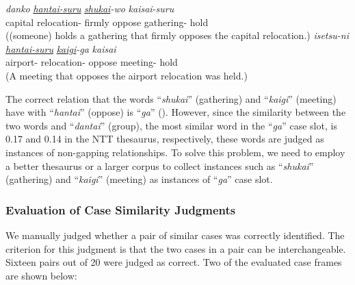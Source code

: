 \documentclass[english]{jnlp_1.4_rep}
\newcommand{\nom}{}
\newcommand{\acc}{}
\newcommand{\dat}{}
\newcommand{\gen}{}
\begin{document}
\begin{exe}
\ex
 \begin{xlist}
 \ex
   {\textit{danko}} {\textit{\underline{\underline{hantai-suru}}}} {\textit{\underline{shukai}-wo}} {\textit{kaisai-suru}} \\
       {capital relocation-\dat} {firmly} {oppose} {gathering-\acc} {hold} \\
  \trans ((someone) holds a gathering that firmly opposes the capital relocation.)
 \ex
   {\textit{isetsu-ni}} {\textit{\underline{\underline{hantai-suru}}}} {\textit{\underline{kaigi}-ga}} {\textit{kaisai}} \\
       {airport-\gen} {relocation-\dat} {oppose} {meeting-\nom} {hold} \\
   \trans (A meeting that opposes the airport relocation was held.)
 \end{xlist}
\end{exe}

The correct relation that the words ``\textit{shukai}'' (gathering)
and ``\textit{kaigi}'' (meeting) have with ``\textit{hantai}''
(oppose) is ``\textit{ga}'' (\nom). However, since the similarity
between the two words and ``\textit{dantai}'' (group), the most
similar word in the ``\textit{ga}'' case slot, is 0.17 and 0.14 in the
NTT thesaurus, respectively, these words are judged as instances of non-gapping
relationships.  To solve this problem, we need to employ a better
thesaurus or a larger corpus to collect instances such as
``\textit{shukai}'' (gathering) and ``\textit{kaigi}'' (meeting) as
instances of ``\textit{ga}'' case slot.


\subsubsection*{Evaluation of Case Similarity Judgments}

We manually judged whether a pair of similar cases was correctly
identified. The criterion for this judgment is that the two cases in a
pair can be interchangeable. Sixteen pairs out of 20 were judged as
correct. Two of the evaluated case frames are shown below:
\end{document}
